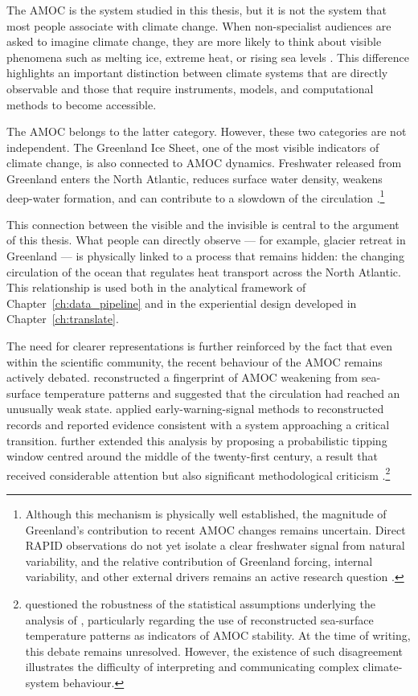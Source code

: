 The AMOC is the system studied in this thesis, but it is not the system that most people associate with climate change. When non-specialist audiences are asked to imagine climate change, they are more likely to think about visible phenomena such as melting ice, extreme heat, or rising sea levels \citep{oneill2014}. This difference highlights an important distinction between climate systems that are directly observable and those that require instruments, models, and computational methods to become accessible.

The AMOC belongs to the latter category. However, these two categories are not independent. The Greenland Ice Sheet, one of the most visible indicators of climate change, is also connected to AMOC dynamics. Freshwater released from Greenland enters the North Atlantic, reduces surface water density, weakens deep-water formation, and can contribute to a slowdown of the circulation \citep{boning2016, rahmstorf2015, caesar2018}.\footnote{Although this mechanism is physically well established, the magnitude of Greenland's contribution to recent AMOC changes remains uncertain. Direct RAPID observations do not yet isolate a clear freshwater signal from natural variability, and the relative contribution of Greenland forcing, internal variability, and other external drivers remains an active research question \citep{caesar2018}.}

This connection between the visible and the invisible is central to the argument of this thesis. What people can directly observe --- for example, glacier retreat in Greenland --- is physically linked to a process that remains hidden: the changing circulation of the ocean that regulates heat transport across the North Atlantic. This relationship is used both in the analytical framework of Chapter~\ref{ch:data_pipeline} and in the experiential design developed in Chapter~\ref{ch:translate}.

The need for clearer representations is further reinforced by the fact that even within the scientific community, the recent behaviour of the AMOC remains actively debated. \citet{caesar2018} reconstructed a fingerprint of AMOC weakening from sea-surface temperature patterns and suggested that the circulation had reached an unusually weak state. \citet{boers2021} applied early-warning-signal methods to reconstructed records and reported evidence consistent with a system approaching a critical transition. \citet{ditlevsen2023} further extended this analysis by proposing a probabilistic tipping window centred around the middle of the twenty-first century, a result that received considerable attention but also significant methodological criticism \citep{benyami2024}.\footnote{\citet{benyami2024} questioned the robustness of the statistical assumptions underlying the analysis of \citet{ditlevsen2023}, particularly regarding the use of reconstructed sea-surface temperature patterns as indicators of AMOC stability. At the time of writing, this debate remains unresolved. However, the existence of such disagreement illustrates the difficulty of interpreting and communicating complex climate-system behaviour.}

